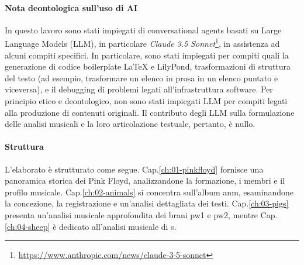\documentclass[class=book, crop=false, oneside, 12pt]{standalone}
\begin{document}
\paragraph{Nota deontologica sull'uso di AI}
In questo lavoro sono stati impiegati di conversational agents basati su Large Language Models (LLM), in particolare \emph{Claude 3.5 Sonnet}\footnote{\url{https://www.anthropic.com/news/claude-3-5-sonnet}}, in assistenza ad alcuni compiti specifici. In particolare, sono stati impiegati per compiti quali la generazione di codice boilerplate LaTeX e LilyPond, trasformazioni di struttura del testo (ad esempio, trasformare un elenco in prosa in un elenco puntato e viceversa), e il debugging di problemi legati all'infrastruttura software. Per principio etico e deontologico, non sono stati impiegati LLM per compiti legati alla produzione di contenuti originali. Il contributo degli LLM sulla formulazione delle analisi musicali e la loro articolazione testuale, pertanto, è nullo.

\paragraph{Struttura}
L'elaborato è strutturato come segue. Cap.\ref{ch:01-pinkfloyd} fornisce una panoramica storica dei Pink Floyd, analizzandone la formazione, i membri e il profilo musicale. Cap.\ref{ch:02-animals} si concentra sull'album \acrlong{anm}, esaminandone la concezione, la registrazione e un'analisi dettagliata dei testi. Cap.\ref{ch:03-pigs} presenta un'analisi musicale approfondita dei brani \acrlong{pw1} e \acrlong{pw2}, mentre Cap.\ref{ch:04-sheep} è dedicato all'analisi musicale di \acrlong{s}.
\end{document}
